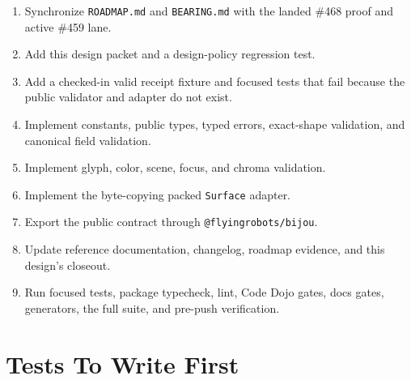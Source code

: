 \begin{enumerate}
\def\labelenumi{\arabic{enumi}.}
\tightlist
\item
  Synchronize \texttt{R\allowbreak{}O\allowbreak{}A\allowbreak{}D\allowbreak{}M\allowbreak{}A\allowbreak{}P\allowbreak{}.\allowbreak{}m\allowbreak{}d} and \texttt{B\allowbreak{}E\allowbreak{}A\allowbreak{}R\allowbreak{}I\allowbreak{}N\allowbreak{}G\allowbreak{}.\allowbreak{}m\allowbreak{}d} with the landed \#468 proof and active \#459 lane.
\item
  Add this design packet and a design-policy regression test.
\item
  Add a checked-in valid receipt fixture and focused tests that fail because the public validator and adapter do not exist.
\item
  Implement constants, public types, typed errors, exact-shape validation, and canonical field validation.
\item
  Implement glyph, color, scene, focus, and chroma validation.
\item
  Implement the byte-copying packed \texttt{S\allowbreak{}u\allowbreak{}r\allowbreak{}f\allowbreak{}a\allowbreak{}c\allowbreak{}e} adapter.
\item
  Export the public contract through \texttt{@\allowbreak{}f\allowbreak{}l\allowbreak{}y\allowbreak{}i\allowbreak{}n\allowbreak{}g\allowbreak{}r\allowbreak{}o\allowbreak{}b\allowbreak{}o\allowbreak{}t\allowbreak{}s\allowbreak{}/\allowbreak{}b\allowbreak{}i\allowbreak{}j\allowbreak{}o\allowbreak{}u}.
\item
  Update reference documentation, changelog, roadmap evidence, and this design's closeout.
\item
  Run focused tests, package typecheck, lint, Code Dojo gates, docs gates, generators, the full suite, and pre-push verification.
\end{enumerate}

\section{Tests To Write First}\label{record-164-tests-to-write-first}

